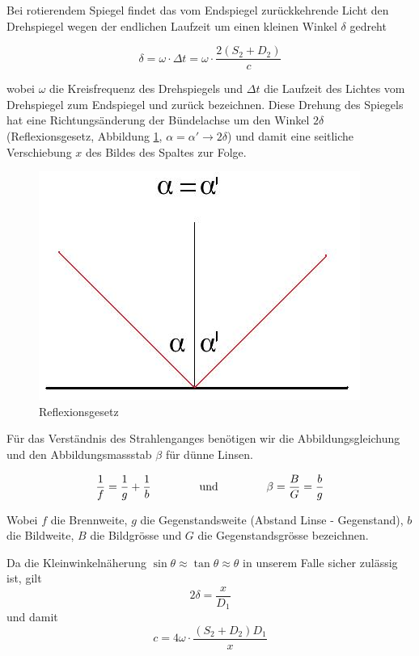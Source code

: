 Bei rotierendem Spiegel findet  das  vom  Endspiegel  zur\"uckkehrende Licht den
Drehspiegel wegen der  endlichen  Laufzeit  um  einen  kleinen  Winkel  $\delta$
gedreht

\begin{equation}
    \delta = \omega \cdot \Delta t = \omega \cdot \frac{2(S_2 + D_2)}{c}
    \label{eq:delta}
\end{equation}

wobei  $\omega$  die Kreisfrequenz des Drehspiegels und $\Delta t$ die  Laufzeit
des  Lichtes  vom  Drehspiegel zum Endspiegel  und  zur\"uck  bezeichnen.  Diese
Drehung des Spiegels  hat  eine  Richtungs\"anderung  der  B\"undelachse  um den
Winkel   $2\delta$  (Reflexionsgesetz,   Abbildung   \ref{fig:reflexionsgesetz},
$\alpha=\alpha'  \to  2\delta$)  und  damit eine seitliche Verschiebung $x$  des
Bildes des Spaltes zur Folge.

\begin{figure}[H]
    \center
    \includegraphics[width=.4\textwidth]{images/reflexionsgesetz.jpg}
    \caption{Reflexionsgesetz}
    \label{fig:reflexionsgesetz}
\end{figure}

F\"ur   das   Verst\"andnis    des    Strahlenganges    ben\"otigen    wir   die
Abbildungsgleichung und  den  Abbildungsmassstab  $\beta$  f\"ur d\"unne Linsen.

\begin{equation}
    \frac{1}{f} = \frac{1}{g} + \frac{1}{b}
    \hspace{15mm}\textrm{und}\hspace{15mm}
    \beta = \frac{B}{G} = \frac{b}{g}
    \label{eq:optik}
\end{equation}

Wobei $f$ die Brennweite, $g$ die Gegenstandsweite (Abstand Linse - Gegenstand),
$b$  die  Bildweite,  $B$  die  Bildgr\"osse  und  $G$  die  Gegenstandsgr\"osse
bezeichnen.

Da die Kleinwinkeln\"aherung $\sin\theta \approx \tan\theta \approx \theta$ in
unserem Falle sicher zul\"assig ist, gilt
\begin{equation}
    2\delta = \frac{x}{D_1}
    \label{eq:kleinwinkelapprox}
\end{equation}
und damit
\begin{equation}
    c = 4\omega \cdot \frac{(S_2 + D_2)D_1}{x}
    \label{eq:deltaumformung}
\end{equation}


